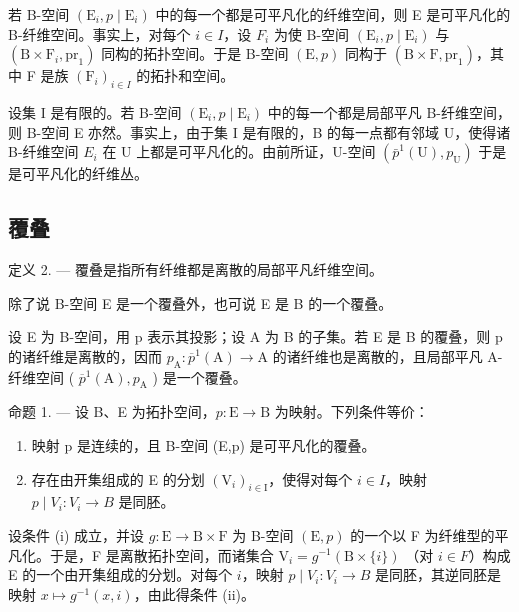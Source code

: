 若 B-空间 \((\mathrm{E}_{i}, p \mid \mathrm{E}_{i})\) 中的每一个都是可平凡化的纤维空间，则 E 是可平凡化的 B-纤维空间。事实上，对每个 \(i \in I\)，设 \(F_{i}\) 为使 B-空间 \((\mathrm{E}_{i}, p \mid \mathrm{E}_{i})\) 与 \((\mathrm{B} \times \mathrm{F}_{i}, \mathrm{pr}_{1})\) 同构的拓扑空间。于是 B-空间 \((\mathrm{E}, p)\) 同构于 \((\mathrm{B} \times \mathrm{F}, \mathrm{pr}_{1})\)，其中 F 是族 \((\mathrm{F}_{i})_{i \in I}\) 的拓扑和空间。

设集 I 是有限的。若 B-空间 \((\mathrm{E}_{i}, p \mid \mathrm{E}_{i})\) 中的每一个都是局部平凡 B-纤维空间，则 B-空间 E 亦然。事实上，由于集 I 是有限的，B 的每一点都有邻域 U，使得诸 B-纤维空间 \(E_{i}\) 在 U 上都是可平凡化的。由前所证，U-空间 \((\bar{p}^{1}(\mathrm{U}), p_{\mathrm{U}})\) 于是是可平凡化的纤维丛。

\subsection{覆叠}

定义 2. --- 覆叠是指所有纤维都是离散的局部平凡纤维空间。

除了说 B-空间 E 是一个覆叠外，也可说 E 是 B 的一个覆叠。

设 E 为 B-空间，用 p 表示其投影；设 A 为 B 的子集。若 E 是 B 的覆叠，则 p 的诸纤维是离散的，因而 \(p_{\mathrm{A}} \colon \overline{p}^{1}(\mathrm{A}) \to \mathrm{A}\) 的诸纤维也是离散的，且局部平凡 A-纤维空间 ( \(\overline{p}^{1}(\mathrm{A}), p_{\mathrm{A}}\) ) 是一个覆叠。

命题 1. --- 设 B、E 为拓扑空间，\(p\colon \mathrm{E}\to \mathrm{B}\) 为映射。下列条件等价：

\begin{enumerate}
\def\labelenumi{(\roman{enumi})}
\item
  映射 p 是连续的，且 B-空间 (E,p) 是可平凡化的覆叠。
\item
  存在由开集组成的 E 的分划 \((\mathrm{V}_{i})_{i\in\mathrm{I}}\)，使得对每个 \(i\in I\)，映射 \(p\mid V_{i}\colon V_{i}\to B\) 是同胚。
\end{enumerate}

设条件 (i) 成立，并设 \(g \colon \mathrm{E} \to \mathrm{B} \times \mathrm{F}\) 为 B-空间 \((\mathrm{E}, p)\) 的一个以 F 为纤维型的平凡化。于是，F 是离散拓扑空间，而诸集合 \(\mathrm{V}_i = g^{-1}(\mathrm{B} \times \{i\})\) （对 \(i \in F\)）构成 E 的一个由开集组成的分划。对每个 \(i\)，映射 \(p \mid V_i \colon V_i \to B\) 是同胚，其逆同胚是映射 \(x \mapsto g^{-1}(x, i)\)，由此得条件 (ii)。

